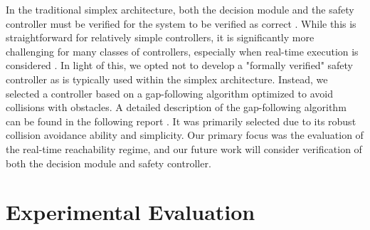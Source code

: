 \documentclass[manuscript,screen,review]{acmart}
\newcommand{\todo}[1]{\textcolor{red}{\textbf{\underline{TODO:}} #1}}
\begin{document}

In the traditional simplex architecture, both the decision module and the safety controller must be verified for the system to be verified as correct \cite{Mehmood2021}. While this is straightforward for relatively simple controllers, it is significantly more challenging for many classes of controllers, especially when real-time execution is considered \cite{ivanov2020case}. In light of this, we opted not to develop a "formally verified" safety controller as is typically used within the simplex architecture. Instead, we selected a controller based on a gap-following algorithm optimized to avoid collisions with obstacles. A detailed description of the gap-following algorithm can be found in the following report \cite{otterness_2019}. It was primarily selected due to its robust collision avoidance ability and simplicity. Our primary focus was the evaluation of the real-time reachability regime, and our future work will consider verification of both the decision module and safety controller. 


\section{Experimental Evaluation}
\label{sec:experiments}

\end{document}

